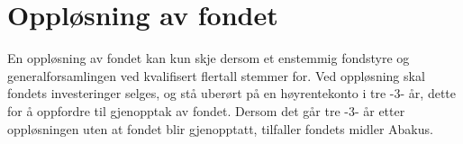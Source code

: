\section{Oppløsning av fondet}
En oppløsning av fondet kan kun skje dersom et enstemmig fondstyre og
generalforsamlingen ved kvalifisert flertall stemmer for. Ved oppløsning skal
fondets investeringer selges, og stå uberørt på en høyrentekonto i tre -3- år,
dette for å oppfordre til gjenopptak av fondet. Dersom det går tre -3- år etter
oppløsningen uten at fondet blir gjenopptatt, tilfaller fondets midler Abakus.
